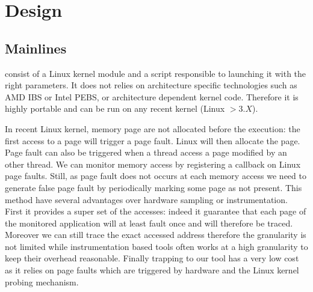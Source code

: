 \section{Design}
\label{sec:design}

\subsection{Mainlines}

\Moca consist of a Linux kernel module and a script responsible to launching it
with the right parameters. It does not relies on architecture specific
technologies such as AMD IBS or Intel PEBS, or architecture dependent kernel
code. Therefore it is highly portable and can be run on any recent kernel
(Linux $> 3.X$).

In recent Linux kernel, memory page are not allocated before the execution: the
first access to a page will trigger a page fault. Linux will then allocate the
page. Page fault can also be triggered when a thread access a page modified by
an other thread. We can monitor memory access by registering a callback on
Linux page faults. Still, as  page fault does not occurs at each memory access
we need to generate false page fault by periodically marking some page as not
present. This method have several advantages over hardware sampling or
instrumentation. First it provides a super set of the accesses: indeed it
guarantee that each page of the monitored application will at least fault once
and will therefore be traced. Moreover we can still trace the exact accessed address
therefore the granularity is not limited while instrumentation based tools
often works at a high granularity to keep their overhead reasonable.  Finally
trapping to our tool has a very low cost as it relies on page faults which
are triggered by hardware and the Linux kernel probing mechanism.


